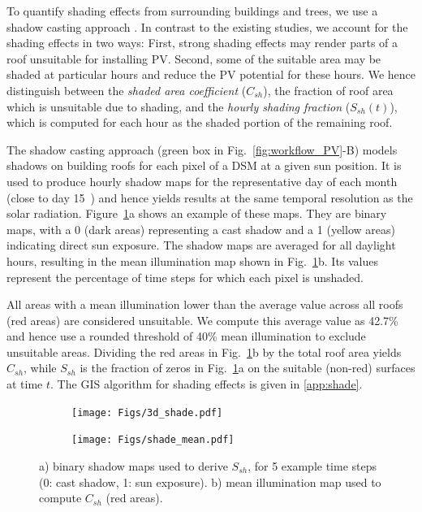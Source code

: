 To quantify shading effects from surrounding buildings and trees, we use a shadow casting approach \cite{buffat_scalable_2018, desthieux_solar_2018, klauser_solarpotentialanalyse_2016, ramirez_camargo_spatio-temporal_2015}. 
In contrast to the existing studies, we account for the shading effects in two ways:
First, strong shading effects may render parts of a roof unsuitable for installing PV. 
Second, some of the suitable area may be shaded at particular hours and reduce the PV potential for these hours. We hence distinguish between the \textit{shaded area coefficient} ($C_{sh}$), the fraction of roof area which is unsuitable due to shading, and the \textit{hourly shading fraction} ($S_{sh}(t)$), which is computed for each hour as the shaded portion of the remaining roof. 

The shadow casting approach (green box in Fig.~\ref{fig:workflow_PV}-B) models shadows on building roofs for each pixel of a DSM at a given sun position. It is used to produce hourly shadow maps for the representative day of each month (close to day 15~\cite{desthieux_solar_2018}) and hence yields results at the same temporal resolution as the solar radiation.
Figure~\ref{fig:horizons}a shows an example of these maps. They are binary maps, with a 0 (dark areas) representing a cast shadow and a 1 (yellow areas) indicating direct sun exposure. The shadow maps are averaged for all daylight hours, resulting in the mean illumination map shown in Fig.~\ref{fig:horizons}b. Its values represent the percentage of time steps for which each pixel is unshaded.

All areas with a mean illumination lower than the average value across all roofs (red areas) are considered unsuitable. 
We compute this average value as 42.7\% and hence use a rounded threshold of 40\% mean illumination to exclude unsuitable areas.
Dividing the red areas in Fig.~\ref{fig:horizons}b by the total roof area yields $C_{sh}$, while $S_{sh}$ is the fraction of zeros in Fig.~\ref{fig:horizons}a on the suitable (non-red) surfaces at time $t$. The GIS algorithm for shading effects is given in \ref{app:shade}. 

\begin{figure}[tb]
	\centering
	\begin{subfigure}{.52\textwidth}
		\centering
		\texttt{[image: Figs/3d\_shade.pdf]} 
		\subcaption{}
	\end{subfigure}
	\begin{subfigure}{.44\textwidth}
		\centering
		\texttt{[image: Figs/shade\_mean.pdf]}  
		\subcaption{}
	\end{subfigure}
	\caption{a) binary shadow maps used to derive $S_{sh}$, for 5 example time steps (0: cast shadow, 1: sun exposure). b) mean illumination map used to compute $C_{sh}$ (red areas).}
	\label{fig:horizons}
\end{figure}

